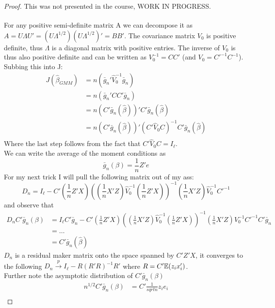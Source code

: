 \documentclass[DIV=14,titlepage=false]{scrreprt}
\begin{document}
\begin{proof}
    This was not presented in the course, WORK IN PROGRESS.\\\\
    For any positive semi-definite matrix A we can decompose it as $A = U \Lambda U' = (U \Lambda^{1/2})(U \Lambda^{1/2})'=BB'$. The covariance matrix $V_0$ is positive definite, thus $\Lambda$ is a diagonal matrix with positive entries. The inverse of $V_0$ is thus also positive definite and can be written as $V_0^{-1} = CC'$ (and $V_0 = C'^{-1}C^{-1}$).\\
    Subbing this into J:
    \begin{align*}
        J(\hat\beta_{GMM}) &= n(\bar g_n' \hat V_0^{-1} \bar g_n)\\
        &= n(\bar g_n' C C' \bar g_n)\\
        &= n(C' \bar g_n(\hat \beta))' C' \bar g_n(\hat \beta)\\
        &= n(C' \bar g_n(\hat \beta))'(C' \hat V_0 C)^{-1} C' \bar g_n(\hat \beta)\\
    \end{align*}
    Where the last step follows from the fact that $C' \hat V_0 C = I_{\ell}$.\\
    We can write the average of the moment conditions as \[ \bar g_n (\beta) = \frac{1}{n} Z'e\]For my next trick I will pull the following matrix out of my ass:
    \[
        D_n = I_{\ell}- C ' \left(\frac{1}{n}Z'X\right)\left( \left(\frac{1}{n}X'Z\right) \hat V_0 ^{-1}  \left(\frac{1}{n}Z'X\right)\right)^{-1} \left(\frac{1}{n}X'Z\right)\hat V_0^{-1}C'^{-1}
    \]
    and observe that 
    \begin{align*}
        D_n C ' \bar g_n (\beta) &= I_{\ell} C '\bar g_n- C ' \left(\frac{1}{n}Z'X\right)\left( \left(\frac{1}{n}X'Z\right) \hat V_0 ^{-1}  \left(\frac{1}{n}Z'X\right)\right)^{-1} \left(\frac{1}{n}X'Z\right)V_0^{-1}C'^{-1} C '\bar g_n\\
        &= \dots\\
        &= C' \bar g_n(\hat \beta)
    \end{align*}
    $D_n$ is a residual maker matrix onto the space spanned by $C'Z'X$, it converges to the following $D_n \overset{p}{\to} I_{\ell} - R(R'R)^{-1}R'$ where $R=C'\mathbb{E}(z_i x_i')$.\\
    Further note the asymptotic distribution of $C'\bar g_n(\beta)$
    \begin{align*}
        n^{1/2}C'\bar g_n(\beta) &= C'\frac{1}{sqrt{n}}z_i e_i\\

\end{align*}
\end{proof}
\end{document}
